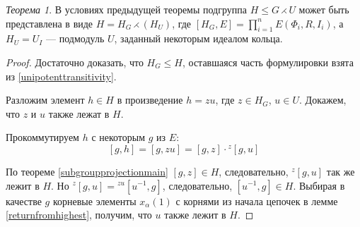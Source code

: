 \documentclass[10pt]{article}
\theoremstyle{remark}
\newtheorem{thm}{Теорема}
\renewcommand{\le}{\leqslant}
\begin{document}
\begin{thm}
В условиях предыдущей теоремы подгруппа $H\le G \rightthreetimes U$ может быть представлена в виде $H = H_G \rightthreetimes (H_U)$, где $[H_G,E] = \prod_{i=1}^n E(\Phi_i, R, I_i)$, а $H_U=U_I$ --- подмодуль $U$, заданный некоторым идеалом кольца.
\end{thm}
\begin{proof}
Достаточно доказать, что $H_G \le H$, оставшаяся часть формулировки взята из \ref{unipotenttransitivity}.

Разложим элемент $h \in H$ в произведение $h = z u$, где $z \in H_G$, $u \in U$. Докажем, что $z$ и $u$ также лежат в $H$.

Прокоммутируем $h$ с некоторым $g$ из $E$:
$$ [g, h] = [g,zu] = [g,z] \cdot {}^z[g,u] $$

По теореме \ref{subgroupprojectionmain} $[g,z]\in H$, следовательно, ${}^z[g,u]$ так же лежит в $H$. Но
$ {}^z[g,u] = {}^{zu}[u^{-1},g] $, следовательно, $[u^{-1},g] \in H$. Выбирая в качестве $g$ корневые элементы $x_\alpha(1)$ с корнями из начала цепочек в лемме \ref{returnfromhighest}, получим, что $u$ также лежит в $H$.
\end{proof}






\end{document}
